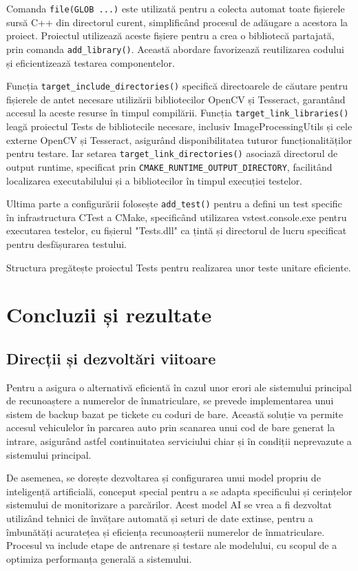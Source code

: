 \documentclass[a4paper,12pt]{report}
\begin{document}
Comanda \texttt{file(GLOB ...)} este utilizată pentru a colecta automat toate fișierele sursă C++ din directorul curent, simplificând procesul de adăugare a acestora la proiect. Proiectul utilizează aceste fișiere pentru a crea o bibliotecă partajată, prin comanda \texttt{add\_library()}. Această abordare favorizează reutilizarea codului și eficientizează testarea componentelor.

Funcția \texttt{target\_include\_directories()} specifică directoarele de căutare pentru fișierele de antet necesare utilizării bibliotecilor OpenCV și Tesseract, garantând accesul la aceste resurse în timpul compilării. Funcția  \texttt{target\_link\_libraries()} leagă proiectul Tests de bibliotecile necesare, inclusiv ImageProcessingUtils și cele externe OpenCV și Tesseract, asigurând disponibilitatea tuturor funcționalităților pentru testare. Iar setarea \texttt{target\_link\_directories()} asociază directorul de output runtime, specificat prin \texttt{CMAKE\_RUNTIME\_OUTPUT\_DIRECTORY}, facilitând localizarea executabilului și a bibliotecilor în timpul execuției testelor.

Ultima parte a configurării folosește \texttt{add\_test()} pentru a defini un test specific în infrastructura CTest a CMake, specificând utilizarea vstest.console.exe pentru executarea testelor, cu fișierul "Tests.dll" ca țintă și directorul de lucru specificat pentru desfășurarea testului.

Structura pregătește proiectul Tests pentru realizarea unor teste unitare eficiente.

\chapter{Concluzii și rezultate}
\section{Direcții și dezvoltări viitoare}
Pentru a asigura o alternativă eficientă în cazul unor erori ale sistemului principal de recunoaștere a numerelor de înmatriculare, se prevede implementarea unui sistem de backup bazat pe tickete cu coduri de bare. Această soluție va permite accesul vehiculelor în parcarea auto prin scanarea unui cod de bare generat la intrare, asigurând astfel continuitatea serviciului chiar și în condiții neprevazute a sistemului principal.

De asemenea, se dorește dezvoltarea și configurarea unui model propriu de inteligență artificială, conceput special pentru a se adapta specificului și cerințelor sistemului de monitorizare a parcărilor. Acest model AI se vrea a fi dezvoltat utilizând tehnici de învățare automată și seturi de date extinse, pentru a îmbunătăți acuratețea și eficiența recunoașterii numerelor de înmatriculare. Procesul va include etape de antrenare și testare ale modelului, cu scopul de a optimiza performanța generală a sistemului.
\end{document}
